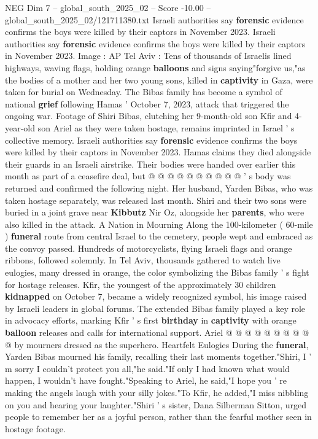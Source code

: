\begin{textsample}{NEG Dim 7 – global\_south\_2025\_02 – Score -10.00 – global\_south\_2025\_02/121711380.txt}  \label{ex:f7_neg_261}
Israeli authorities say \textbf{forensic} evidence confirms the boys were killed by their captors in November 2023.
Israeli authorities say \textbf{forensic} evidence confirms the boys were killed by their captors in November 2023.
Image : AP Tel Aviv : Tens of thousands of Israelis lined highways, waving flags, holding orange \textbf{balloons} and signs saying"forgive us,"as the bodies of a mother and her two young sons, killed in \textbf{captivity} in Gaza, were taken for burial on Wednesday.
The Bibas family has become a symbol of national \textbf{grief} following Hamas ' October 7, 2023, attack that triggered the ongoing war.
Footage of Shiri Bibas, clutching her 9-month-old son Kfir and 4-year-old son Ariel as they were taken hostage, remains imprinted in Israel ' s collective memory.
Israeli authorities say \textbf{forensic} evidence confirms the boys were killed by their captors in November 2023.
Hamas claims they died alongside their guards in an Israeli airstrike.
Their bodies were handed over earlier this month as part of a ceasefire deal, but @ @ @ @ @ @ @ @ @ @ ' s body was returned and confirmed the following night.
Her husband, Yarden Bibas, who was taken hostage separately, was released last month.
Shiri and their two sons were buried in a joint grave near \textbf{Kibbutz} Nir Oz, alongside her \textbf{parents}, who were also killed in the attack.
A Nation in Mourning Along the 100-kilometer ( 60-mile ) \textbf{funeral} route from central Israel to the cemetery, people wept and embraced as the convoy passed.
Hundreds of motorcyclists, flying Israeli flags and orange ribbons, followed solemnly.
In Tel Aviv, thousands gathered to watch live eulogies, many dressed in orange, the color symbolizing the Bibas family ' s fight for hostage releases.
Kfir, the youngest of the approximately 30 children \textbf{kidnapped} on October 7, became a widely recognized symbol, his image raised by Israeli leaders in global forums.
The extended Bibas family played a key role in advocacy efforts, marking Kfir ' s first \textbf{birthday} in \textbf{captivity} with orange \textbf{balloon} releases and calls for international support.
Ariel @ @ @ @ @ @ @ @ @ @ by mourners dressed as the superhero.
Heartfelt Eulogies During the \textbf{funeral}, Yarden Bibas mourned his family, recalling their last moments together."Shiri, I ' m sorry I couldn't protect you all,"he said."If only I had known what would happen, I wouldn't have fought."Speaking to Ariel, he said,"I hope you ' re making the angels laugh with your silly jokes."To Kfir, he added,"I miss nibbling on you and hearing your laughter."Shiri ' s sister, Dana Silberman Sitton, urged people to remember her as a joyful person, rather than the fearful mother seen in hostage footage.

\end{textsample}
